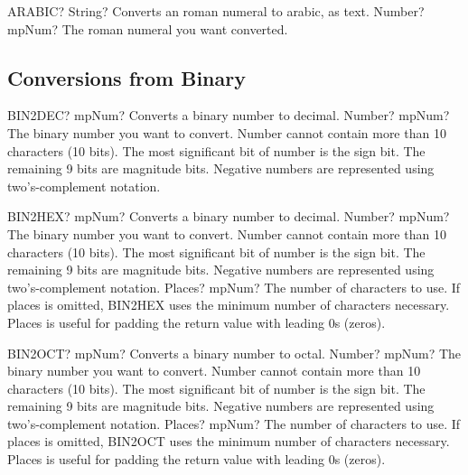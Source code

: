 \vspace{0.6cm}

\begin{mpFunctionsExtract}
	\mpWorksheetFunctionOneNotImplemented
	{ARABIC? String? Converts an roman numeral to arabic, as text.}
	{Number? mpNum? The roman numeral you want converted.}
\end{mpFunctionsExtract}




\subsection{Conversions from Binary}

\begin{mpFunctionsExtract}
	\mpWorksheetFunctionOneNotImplemented
	{BIN2DEC? mpNum? Converts a binary number to decimal.}
	{Number? mpNum? The binary number you want to convert. Number cannot contain more than 10 characters (10 bits). The most significant bit of number is the sign bit. The remaining 9 bits are magnitude bits. Negative numbers are represented using two's-complement notation.}
\end{mpFunctionsExtract}


\vspace{0.6cm}
\begin{mpFunctionsExtract}
	\mpWorksheetFunctionTwoNotImplemented
	{BIN2HEX? mpNum? Converts a binary number to decimal.}
	{Number? mpNum? The binary number you want to convert. Number cannot contain more than 10 characters (10 bits). The most significant bit of number is the sign bit. The remaining 9 bits are magnitude bits. Negative numbers are represented using two's-complement notation.}
	{Places? mpNum? The number of characters to use. If places is omitted, BIN2HEX uses the minimum number of characters necessary. Places is useful for padding the return value with leading 0s (zeros).}
\end{mpFunctionsExtract}


\vspace{0.6cm}
\begin{mpFunctionsExtract}
	\mpWorksheetFunctionTwoNotImplemented
	{BIN2OCT? mpNum? Converts a binary number to octal.}
	{Number? mpNum? The binary number you want to convert. Number cannot contain more than 10 characters (10 bits). The most significant bit of number is the sign bit. The remaining 9 bits are magnitude bits. Negative numbers are represented using two's-complement notation.}
	{Places? mpNum? The number of characters to use. If places is omitted, BIN2OCT uses the minimum number of characters necessary. Places is useful for padding the return value with leading 0s (zeros).}
\end{mpFunctionsExtract}



